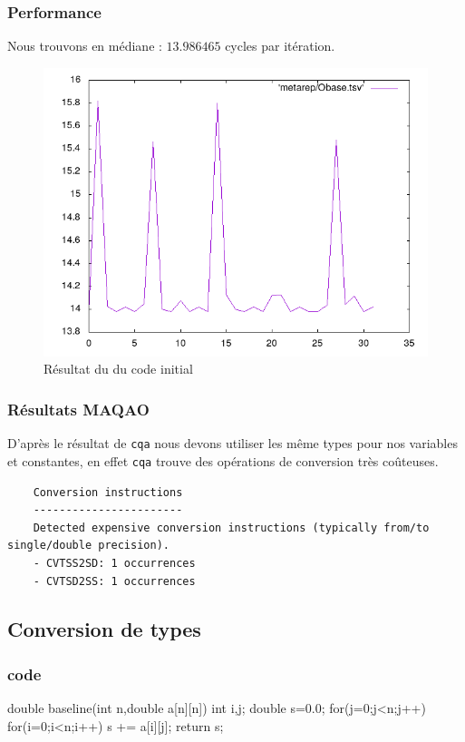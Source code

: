 \documentclass{report}
\begin{document}
  \subsubsection{Performance}
  Nous trouvons en médiane : $13.986465$ cycles par itération.
  \begin{figure}[ht!]
    \centering
    \includegraphics[scale=0.45]{../metarep/Obase.png}
    \caption{Résultat du du code initial}
  \end{figure}
  \subsubsection{Résultats MAQAO}
  D'après le résultat de \texttt{cqa} nous devons utiliser les même types pour nos variables et
  constantes, en effet \texttt{cqa} trouve des opérations de conversion très coûteuses.
  \begin{verbatim}
    Conversion instructions
    -----------------------
    Detected expensive conversion instructions (typically from/to single/double precision).
    - CVTSS2SD: 1 occurrences
    - CVTSD2SS: 1 occurrences
  \end{verbatim}
  \subsection{Conversion de types}
  \subsubsection{code}
  \begin{cc}
    double baseline(int n,double a[n][n])
    {
        int i,j;
        double s=0.0;
        for(j=0;j<n;j++)
            for(i=0;i<n;i++)
                s += a[i][j];
        return s;
    }
  \end{cc}
\end{document}
